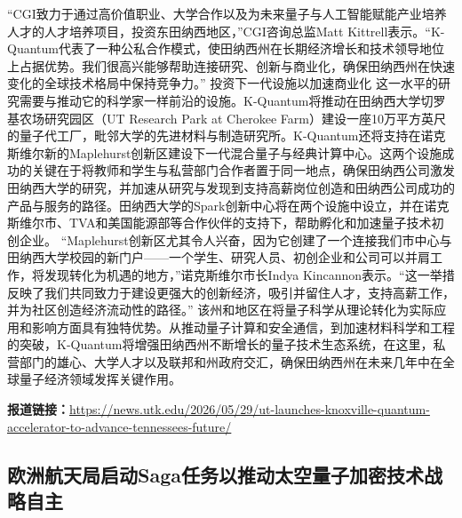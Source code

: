 \documentclass[12pt,a4paper]{ctexart}
\begin{document}
“CGI致力于通过高价值职业、大学合作以及为未来量子与人工智能赋能产业培养人才的人才培养项目，投资东田纳西地区，”CGI咨询总监Matt Kittrell表示。“K-Quantum代表了一种公私合作模式，使田纳西州在长期经济增长和技术领导地位上占据优势。我们很高兴能够帮助连接研究、创新与商业化，确保田纳西州在快速变化的全球技术格局中保持竞争力。”
投资下一代设施以加速商业化
这一水平的研究需要与推动它的科学家一样前沿的设施。K-Quantum将推动在田纳西大学切罗基农场研究园区（UT Research Park at Cherokee Farm）建设一座10万平方英尺的量子代工厂，毗邻大学的先进材料与制造研究所。K-Quantum还将支持在诺克斯维尔新的Maplehurst创新区建设下一代混合量子与经典计算中心。这两个设施成功的关键在于将教师和学生与私营部门合作者置于同一地点，确保田纳西公司激发田纳西大学的研究，并加速从研究与发现到支持高薪岗位创造和田纳西公司成功的产品与服务的路径。田纳西大学的Spark创新中心将在两个设施中设立，并在诺克斯维尔市、TVA和美国能源部等合作伙伴的支持下，帮助孵化和加速量子技术初创企业。
“Maplehurst创新区尤其令人兴奋，因为它创建了一个连接我们市中心与田纳西大学校园的新门户——一个学生、研究人员、初创企业和公司可以并肩工作，将发现转化为机遇的地方，”诺克斯维尔市长Indya Kincannon表示。“这一举措反映了我们共同致力于建设更强大的创新经济，吸引并留住人才，支持高薪工作，并为社区创造经济流动性的路径。”
该州和地区在将量子科学从理论转化为实际应用和影响方面具有独特优势。从推动量子计算和安全通信，到加速材料科学和工程的突破，K-Quantum将增强田纳西州不断增长的量子技术生态系统，在这里，私营部门的雄心、大学人才以及联邦和州政府交汇，确保田纳西州在未来几年中在全球量子经济领域发挥关键作用。

\noindent\textbf{报道链接：}\url{https://news.utk.edu/2026/05/29/ut-launches-knoxville-quantum-accelerator-to-advance-tennessees-future/}

\subsection{ 欧洲航天局启动Saga任务以推动太空量子加密技术战略自主 }
\end{document}
